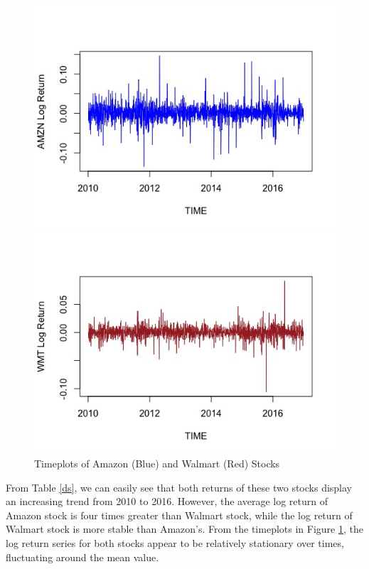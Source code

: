 \documentclass[paper=a4, fontsize=13pt]{article}
\begin{document}
\begin{figure}[!htbp]
\begin{minipage}[!htbp]{0.5\linewidth}
\centering
\includegraphics[scale = 0.45]{img/timeplot_AMZN}
\end{minipage}
\begin{minipage}[!htbp]{0.5\linewidth}
\centering
\includegraphics[scale = 0.45]{img/timeplot_WMT}
\end{minipage}
\caption{Timeplots of Amazon (Blue) and Walmart (Red) Stocks}
\label{tp}
\end{figure}

From Table \ref{ds}, we can easily see that both returns of these two stocks display an increasing trend from 2010 to 2016. However, the average log return of Amazon stock  is four times greater than Walmart stock, while the log return of Walmart stock is more stable than Amazon's. From the timeplots in Figure \ref{tp}, the log return series for both stocks appear to be relatively stationary over times, fluctuating around the mean value.
\end{document}
